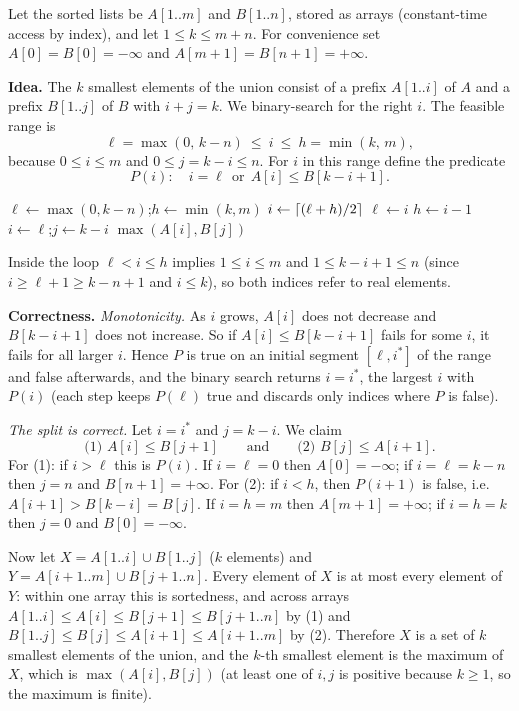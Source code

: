 \documentclass[11pt]{article}
\DeclarePairedDelimiter{\ceil}{\lceil}{\rceil}
\theoremstyle{definition}
\begin{document}
Let the sorted lists be $A[1..m]$ and $B[1..n]$, stored as arrays (constant-time access by index), and let
$1\le k\le m+n$. For convenience set $A[0]=B[0]=-\infty$ and $A[m+1]=B[n+1]=+\infty$.

\textbf{Idea.} The $k$ smallest elements of the union consist of a prefix $A[1..i]$ of $A$ and a prefix
$B[1..j]$ of $B$ with $i+j=k$. We binary-search for the right $i$. The feasible range is
\[
  \ell=\max(0,\,k-n)\ \le\ i\ \le\ h=\min(k,\,m),
\]
because $0\le i\le m$ and $0\le j=k-i\le n$. For $i$ in this range define the predicate
\[
  P(i):\quad i=\ell\ \ \text{or}\ \ A[i]\le B[k-i+1].
\]

\begin{algorithm}[H]
\caption{$k$-th smallest element of $A\cup B$}
\begin{algorithmic}[1]
  \State $\ell\gets\max(0,k-n)$;\quad $h\gets\min(k,m)$
   
    \State $i\gets\ceil{(\ell+h)/2}$ 
      \State $\ell\gets i$
    \Else
      \State $h\gets i-1$
    \EndIf
  \EndWhile
  \State $i\gets\ell$;\quad $j\gets k-i$
  \State \Return $\max(A[i],B[j])$
\EndFunction
\end{algorithmic}
\end{algorithm}

Inside the loop $\ell<i\le h$ implies $1\le i\le m$ and $1\le k-i+1\le n$ (since $i\ge \ell+1\ge k-n+1$ and
$i\le k$), so both indices refer to real elements.

\textbf{Correctness.}
\emph{Monotonicity.} As $i$ grows, $A[i]$ does not decrease and $B[k-i+1]$ does not increase. So if
$A[i]\le B[k-i+1]$ fails for some $i$, it fails for all larger $i$. Hence $P$ is true on an initial segment
$[\ell,i^*]$ of the range and false afterwards, and the binary search returns $i=i^*$, the largest $i$ with $P(i)$
(each step keeps $P(\ell)$ true and discards only indices where $P$ is false).

\emph{The split is correct.} Let $i=i^*$ and $j=k-i$. We claim
\[
  \text{(1) } A[i]\le B[j+1] \qquad\text{and}\qquad \text{(2) } B[j]\le A[i+1].
\]
For (1): if $i>\ell$ this is $P(i)$. If $i=\ell=0$ then $A[0]=-\infty$; if $i=\ell=k-n$ then $j=n$ and
$B[n+1]=+\infty$.
For (2): if $i<h$, then $P(i+1)$ is false, i.e.\ $A[i+1]>B[k-i]=B[j]$. If $i=h=m$ then $A[m+1]=+\infty$; if
$i=h=k$ then $j=0$ and $B[0]=-\infty$.

Now let $X=A[1..i]\cup B[1..j]$ ($k$ elements) and $Y=A[i+1..m]\cup B[j+1..n]$. Every element of $X$ is at most
every element of $Y$: within one array this is sortedness, and across arrays
$A[1..i]\le A[i]\le B[j+1]\le B[j+1..n]$ by (1) and $B[1..j]\le B[j]\le A[i+1]\le A[i+1..m]$ by (2).
Therefore $X$ is a set of $k$ smallest elements of the union, and the $k$-th smallest element is the maximum of
$X$, which is $\max(A[i],B[j])$ (at least one of $i,j$ is positive because $k\ge1$, so the maximum is finite).
\end{document}
